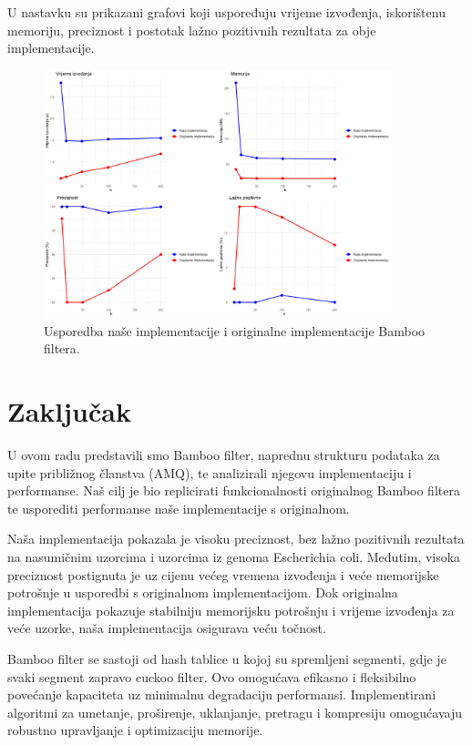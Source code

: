 \documentclass[seminarskirad]{fer}
\begin{document}
U nastavku su prikazani grafovi koji uspoređuju vrijeme izvođenja, iskorištenu memoriju, preciznost i postotak lažno pozitivnih rezultata za obje implementacije.

\begin{figure}[h]
	\centering
	\includegraphics[width=0.9\textwidth]{images/EColi_rezultati.png}
	\caption{Usporedba naše implementacije i originalne implementacije Bamboo filtera.}
	\label{fig:EColi_rezultati}
\end{figure}



\chapter{Zaključak}
\label{pog:zakljucak}
U ovom radu predstavili smo Bamboo filter, naprednu strukturu podataka za upite približnog članstva (AMQ), te analizirali njegovu implementaciju i performanse. Naš cilj je bio replicirati funkcionalnosti originalnog Bamboo filtera te usporediti performanse naše implementacije s originalnom.

Naša implementacija pokazala je visoku preciznost, bez lažno pozitivnih rezultata na nasumičnim uzorcima i uzorcima iz genoma Escherichia coli. Međutim, visoka preciznost postignuta je uz cijenu većeg vremena izvođenja i veće memorijske potrošnje u usporedbi s originalnom implementacijom. Dok originalna implementacija pokazuje stabilniju memorijsku potrošnju i vrijeme izvođenja za veće uzorke, naša implementacija osigurava veću točnost.

Bamboo filter se sastoji od hash tablice u kojoj su spremljeni segmenti, gdje je svaki segment zapravo cuckoo filter. Ovo omogućava efikasno i fleksibilno povećanje kapaciteta uz minimalnu degradaciju performansi. Implementirani algoritmi za umetanje, proširenje, uklanjanje, pretragu i kompresiju omogućavaju robustno upravljanje i optimizaciju memorije.
\end{document}
